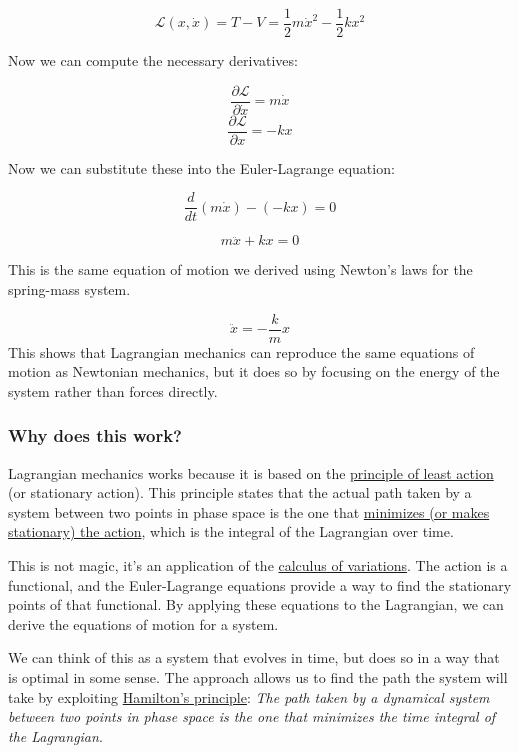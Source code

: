 \documentclass[11pt]{article}
\begin{document}
\[\mathcal{L}(x, \dot{x}) = T - V = \frac{1}{2} m \dot{x}^2 - \frac{1}{2} k x^2\]

Now we can compute the necessary derivatives:

\[\frac{\partial \mathcal{L}}{\partial \dot{x}} = m \dot{x}\]
\[\frac{\partial \mathcal{L}}{\partial x} = -k x\]

Now we can substitute these into the Euler-Lagrange equation:

\[
\frac{d}{dt} \left( m \dot{x} \right) - (-k x) = 0
\]

\[m\ddot{x} + kx = 0\]

This is the same equation of motion we derived using Newton's laws for
the spring-mass system.

\[\ddot{x} = -\frac{k}{m} x\] This shows that Lagrangian mechanics can
reproduce the same equations of motion as Newtonian mechanics, but it
does so by focusing on the energy of the system rather than forces
directly.

    \subsubsection{Why does this work?}\label{why-does-this-work}

Lagrangian mechanics works because it is based on the
\href{https://en.wikipedia.org/wiki/Action_principles}{principle of
least action} (or stationary action). This principle states that the
actual path taken by a system between two points in phase space is the
one that
\href{https://en.wikipedia.org/wiki/Hamilton\%27s_principle}{minimizes
(or makes stationary) the action}, which is the integral of the
Lagrangian over time.

This is not magic, it's an application of the
\href{https://en.wikipedia.org/wiki/Calculus_of_variations}{calculus of
variations}. The action is a functional, and the Euler-Lagrange
equations provide a way to find the stationary points of that
functional. By applying these equations to the Lagrangian, we can derive
the equations of motion for a system.

We can think of this as a system that evolves in time, but does so in a
way that is optimal in some sense. The approach allows us to find the
path the system will take by exploiting
\href{https://en.wikipedia.org/wiki/Hamilton\%27s_principle}{Hamilton's
principle}: \emph{The path taken by a dynamical system between two
points in phase space is the one that minimizes the time integral of the
Lagrangian}.
\end{document}
